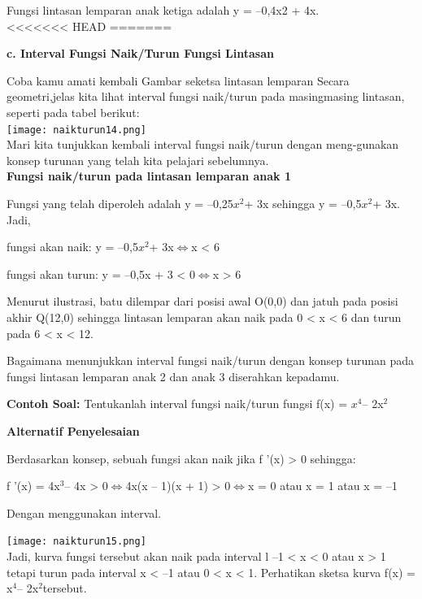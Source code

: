 \documentclass[11pt,fleqn]{book} %
\begin{document}
Fungsi lintasan lemparan anak ketiga adalah y = –0,4x2 +
4x.\\
<<<<<<< HEAD
=======

\textbf{c. Interval Fungsi Naik/Turun Fungsi Lintasan}

Coba kamu amati kembali Gambar seketsa lintasan lemparan Secara geometri,jelas kita lihat interval fungsi naik/turun pada masingmasing lintasan, seperti pada tabel berikut:\\

\texttt{[image: naikturun14.png]}\\

Mari kita tunjukkan kembali interval fungsi naik/turun dengan meng-gunakan konsep turunan yang telah kita pelajari sebelumnya.\\

\textbf{Fungsi naik/turun pada lintasan lemparan anak 1}

Fungsi yang telah diperoleh adalah y = –0,25$x^{2} $+ 3x sehingga y = –0,5$x^{2} $+ 3x. Jadi,

fungsi akan naik: y = –0,5$x^{2} $+ 3x$ \Leftrightarrow $x < 6

fungsi akan turun: y = –0,5x + 3 < 0$ \Leftrightarrow $x > 6

Menurut ilustrasi, batu dilempar dari posisi awal O(0,0) dan jatuh pada posisi akhir Q(12,0) sehingga lintasan lemparan akan naik pada 0 < x < 6 dan turun pada 6 < x < 12.

Bagaimana menunjukkan interval fungsi naik/turun
dengan konsep turunan pada fungsi lintasan lemparan
anak 2 dan anak 3 diserahkan kepadamu.

\textbf {Contoh Soal:} 
Tentukanlah interval fungsi naik/turun fungsi f(x) = $x^{4} $– 2x$^{2}$

\textbf{Alternatif Penyelesaian}

Berdasarkan konsep, sebuah fungsi akan naik jika f '(x) > 0 sehingga:

f '(x) = 4x$^{3} $– 4x > 0$ \Leftrightarrow $4x(x – 1)(x + 1) > 0$ \Leftrightarrow $x = 0 atau x = 1 atau x = –1

Dengan menggunakan interval.

\texttt{[image: naikturun15.png]}\\

Jadi, kurva fungsi tersebut akan naik pada interval l –1 < x < 0 atau x > 1 tetapi turun pada interval x < –1 atau 0 < x < 1. Perhatikan sketsa kurva f(x) = x$^{4} $– 2x$^{2} $tersebut.\\
\end{document}
